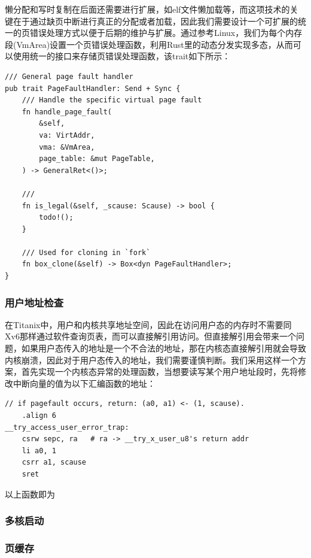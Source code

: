 懒分配和写时复制在后面还需要进行扩展，如elf文件懒加载等，而这项技术的关键在于通过缺页中断进行真正的分配或者加载，因此我们需要设计一个可扩展的统一的页错误处理方式以便于后期的维护与扩展。通过参考Linux，我们为每个内存段(VmArea)设置一个页错误处理函数，利用Rust里的动态分发实现多态，从而可以使用统一的接口来存储页错误处理函数，该trait如下所示：
\begin{tcolorbox}[title=\textbf{os/src/mm/memory\_set/page\_fault\_handler.rs}]
\begin{verbatim}
/// General page fault handler
pub trait PageFaultHandler: Send + Sync {
    /// Handle the specific virtual page fault
    fn handle_page_fault(
        &self,
        va: VirtAddr,
        vma: &VmArea,
        page_table: &mut PageTable,
    ) -> GeneralRet<()>;

    ///
    fn is_legal(&self, _scause: Scause) -> bool {
        todo!();
    }

    /// Used for cloning in `fork`
    fn box_clone(&self) -> Box<dyn PageFaultHandler>;
}
\end{verbatim} 
\end{tcolorbox}

\subsubsection{用户地址检查}

在Titanix中，用户和内核共享地址空间，因此在访问用户态的内存时不需要同Xv6那样通过软件查询页表，而可以直接解引用访问。但直接解引用会带来一个问题，如果用户态传入的地址是一个不合法的地址，那在内核态直接解引用就会导致内核崩溃，因此对于用户态传入的地址，我们需要谨慎判断。我们采用这样一个方案，首先实现一个内核态异常的处理函数，当想要读写某个用户地址段时，先将修改中断向量的值为以下汇编函数的地址：
\begin{tcolorbox}[title=\textbf{os/src/mm/memory\_set/page\_fault\_handler.rs}]
\begin{verbatim}
// if pagefault occurs, return: (a0, a1) <- (1, scause).
    .align 6
__try_access_user_error_trap:
    csrw sepc, ra   # ra -> __try_x_user_u8's return addr
    li a0, 1
    csrr a1, scause
    sret
\end{verbatim} 
\end{tcolorbox}
以上函数即为

\subsubsection{多核启动}


\subsubsection{页缓存}